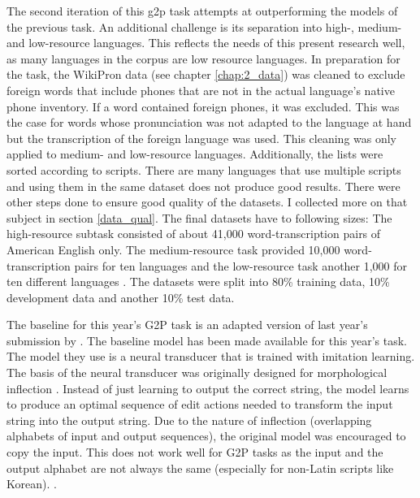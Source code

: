 The second iteration of this \ac{g2p} task attempts at outperforming the models of the previous task. An additional challenge is its separation into high-, medium- and low-resource languages. This reflects the needs of this present research well, as many languages in the corpus are low resource languages. In preparation for the task, the WikiPron data (see chapter \ref{chap:2_data}) was cleaned to exclude foreign words that include phones that are not in the actual language's native phone inventory. If a word contained foreign phones, it was excluded. This was the case for words whose pronunciation was not adapted to the language at hand but the transcription of the foreign language was used. This cleaning was only applied to medium- and low-resource languages. Additionally, the lists were sorted according to scripts. There are many languages that use multiple scripts and using them in the same dataset does not produce good results. There were other steps done to ensure good quality of the datasets. I collected more on that subject in section \ref{data_qual}. 
The final datasets have to following sizes: The high-resource subtask consisted of about 41,000 word-transcription pairs of American English only. The medium-resource task provided 10,000 word-transcription pairs for ten languages and the low-resource task another 1,000 for ten different languages \citep{Ashby&Bartley.2021}. The datasets were split into 80\% training data, 10\% development data and another 10\% test data. 

The baseline for this year's G2P task is an adapted version of last year's submission by \citet{makarov-clematide-2020-cluzh}. The baseline model has been made available for this year's task. The model they use is a neural transducer that is trained with imitation learning. The basis of the neural transducer was originally designed for morphological inflection \citep{Aharoni&Goldberg.2016}. Instead of just learning to output the correct string, the model learns to produce an optimal sequence of edit actions needed to transform the input string into the output string. Due to the nature of inflection (overlapping alphabets of input and output sequences), the original model was encouraged to copy the input. This does not work well for G2P tasks as the input and the output alphabet are not always the same (especially for non-Latin scripts like Korean). .

